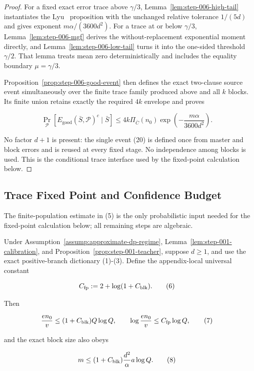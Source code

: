\begin{proof}
For a fixed exact error trace above \(\gamma/3\),
Lemma~\ref{lem:step-006-high-tail} instantiates the Lyu~\citep{lyu2025} proposition
with the unchanged relative tolerance \(1/(5d)\) and gives exponent
\(m\alpha/(3600d^2)\).  For a trace at or below \(\gamma/3\),
Lemma~\ref{lem:step-006-mgf} derives the without-replacement exponential
moment directly, and Lemma~\ref{lem:step-006-low-tail} turns it into the
one-sided threshold \(\gamma/2\).  That lemma treats mean zero
deterministically and includes the equality boundary \(\mu=\gamma/3\).

Proposition~\ref{prop:step-006-good-event} then defines the exact two-clause
source event simultaneously over the finite trace family produced above and
all \(k\) blocks.  Its finite union retains exactly
the required \(4k\) envelope and proves

\[
 \Pr_{\mathcal P}
 [E_{\mathrm{good}}(\bar S,\mathcal P)^c\mid\bar S]
 \leq4k\Pi_{\bar C}(n_0)
 \exp\!\left(-\frac{m\alpha}{3600d^2}\right).
\tag{26}
\]

No factor \(d+1\) is present: the single event (20) is defined once from
master and block errors and is reused at every fixed stage. No
independence among blocks is used.  This is the conditional trace interface
used by the fixed-point calculation below.



\end{proof}

\subsection{Trace Fixed Point and Confidence Budget}\label{app:step_007}


The finite-population estimate in (5) is the only probabilistic input needed
for the fixed-point calculation below; all remaining steps are algebraic.



\begin{lemma}\label{lem:step-007-fixed-point}
Under Assumption~\ref{assump:approximate-dp-regime}, Lemma~\ref{lem:step-001-calibration}, and Proposition~\ref{prop:step-001-teacher}, suppose \(d\ge1\), and use the
exact positive-branch dictionary (1)-(3). Define the appendix-local
universal constant

\[
 C_{\rm fp}:=2+\log(1+C_{\rm blk}).
\tag{6}
\]

Then

\[
 \frac{en_0}{v}\le(1+C_{\rm blk})Q\log Q,
 \qquad
 \log\frac{en_0}{v}\le C_{\rm fp}\log Q,
\tag{7}
\]

and the exact block size also obeys

\[
 m\le(1+C_{\rm blk})
 \frac{d^2}{\alpha}a\log Q.
\tag{8}
\]


\end{lemma}


